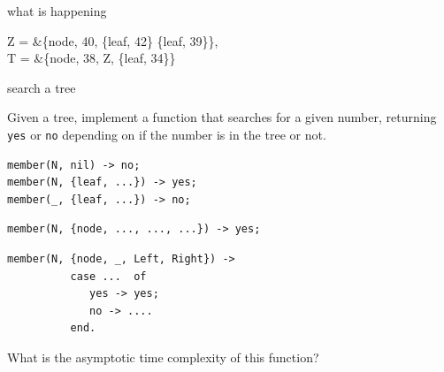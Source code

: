 \begin{frame}{what is happening}

\begin{code}
  Z = &\{node, 40, \{leaf, 42\} \{leaf, 39\}\},\\
  T = &\{node, 38, Z, \{leaf, 34\}\}
\end{code}
\pause \vspace{20pt}


\end{frame}


\begin{frame}[fragile]{search a tree}

Given a tree, implement a function that searches for a given number,
returning {\tt yes} or {\tt no} depending on if the number is in the
tree or not.

\pause\vspace{20pt}

\begin{verbatim}
member(N, nil) -> no;
member(N, {leaf, ...}) -> yes;
member(_, {leaf, ...}) -> no;
\end{verbatim}
\pause
\begin{verbatim}
member(N, {node, ..., ..., ...}) -> yes;
\end{verbatim}
\pause

\begin{verbatim}
member(N, {node, _, Left, Right}) -> 
          case ...  of
             yes -> yes;
             no -> ....
          end.
\end{verbatim}

\pause\vspace{20pt}
What is the asymptotic time complexity of this function?
\end{frame}


